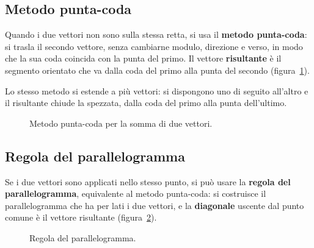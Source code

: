\subsection{Metodo punta-coda}
Quando i due vettori non sono sulla stessa retta, si usa il \textbf{metodo punta-coda}: si trasla il secondo vettore, senza cambiarne modulo, direzione e verso, in modo che la sua coda coincida con la punta del primo. Il vettore \textbf{risultante} è il segmento orientato che va dalla coda del primo alla punta del secondo (figura~\ref{fig:puntacoda}).

Lo stesso metodo si estende a più vettori: si dispongono uno di seguito all'altro e il risultante chiude la spezzata, dalla coda del primo alla punta dell'ultimo.

\begin{figure}[h!]
\centering
{}
\caption{Metodo punta-coda per la somma di due vettori.}
\label{fig:puntacoda}
\end{figure}

\subsection{Regola del parallelogramma}
Se i due vettori sono applicati nello stesso punto, si può usare la \textbf{regola del parallelogramma}, equivalente al metodo punta-coda: si costruisce il parallelogramma che ha per lati i due vettori, e la \textbf{diagonale} uscente dal punto comune è il vettore risultante (figura~\ref{fig:parallelogramma}).

\begin{figure}[h!]
\centering
{}
\caption{Regola del parallelogramma.}
\label{fig:parallelogramma}
\end{figure}

